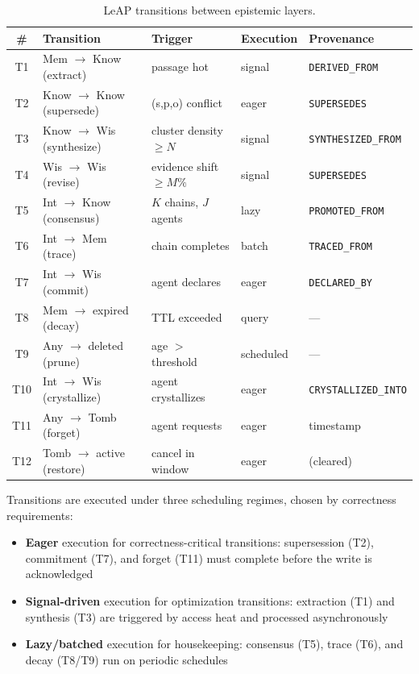 \documentclass[11pt,letterpaper]{article}
\begin{document}
\begin{table}[H]
\centering
\caption{LeAP transitions between epistemic layers.}
\label{tab:transitions}
\begin{tabular}{@{}clllp{3.8cm}@{}}
\toprule
\textbf{\#} & \textbf{Transition} & \textbf{Trigger} & \textbf{Execution} & \textbf{Provenance} \\
\midrule
T1 & Mem $\to$ Know (extract) & passage hot & signal & \texttt{DERIVED\_FROM} \\
T2 & Know $\to$ Know (supersede) & (s,p,o) conflict & eager & \texttt{SUPERSEDES} \\
T3 & Know $\to$ Wis (synthesize) & cluster density $\geq N$ & signal & \texttt{SYNTHESIZED\_FROM} \\
T4 & Wis $\to$ Wis (revise) & evidence shift $\geq M\%$ & signal & \texttt{SUPERSEDES} \\
T5 & Int $\to$ Know (consensus) & $K$ chains, $J$ agents & lazy & \texttt{PROMOTED\_FROM} \\
T6 & Int $\to$ Mem (trace) & chain completes & batch & \texttt{TRACED\_FROM} \\
T7 & Int $\to$ Wis (commit) & agent declares & eager & \texttt{DECLARED\_BY} \\
T8 & Mem $\to$ expired (decay) & TTL exceeded & query & --- \\
T9 & Any $\to$ deleted (prune) & age $>$ threshold & scheduled & --- \\
T10 & Int $\to$ Wis (crystallize) & agent crystallizes & eager & \texttt{CRYSTALLIZED\_INTO} \\
T11 & Any $\to$ Tomb (forget) & agent requests & eager & timestamp \\
T12 & Tomb $\to$ active (restore) & cancel in window & eager & (cleared) \\
\bottomrule
\end{tabular}
\end{table}

Transitions are executed under three scheduling regimes, chosen by correctness requirements:
\begin{itemize}[noitemsep]
    \item \textbf{Eager} execution for correctness-critical transitions: supersession (T2), commitment (T7), and forget (T11) must complete before the write is acknowledged
    \item \textbf{Signal-driven} execution for optimization transitions: extraction (T1) and synthesis (T3) are triggered by access heat and processed asynchronously
    \item \textbf{Lazy/batched} execution for housekeeping: consensus (T5), trace (T6), and decay (T8/T9) run on periodic schedules
\end{itemize}
\end{document}
